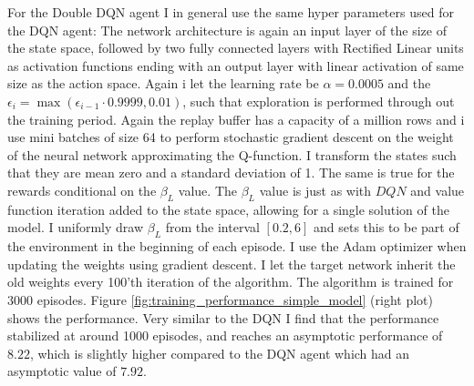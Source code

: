 For the Double DQN agent I in general use the same hyper parameters used for the DQN agent: The network architecture is again an input layer of the size of the state space, followed by two fully connected layers with Rectified Linear units as activation functions ending with an output layer with linear activation of same size as the action space. Again i let the learning rate be $\alpha = 0.0005$ and the $\epsilon_i = \max (\epsilon_{i-1} \cdot 0.9999, 0.01)$, such that exploration is performed through out the training period. Again the replay buffer has a capacity of a million rows and i use mini batches of size 64 to perform stochastic gradient descent on the weight of the neural network approximating the Q-function. I transform the states such that they are mean zero and a standard deviation of 1. The same is true for the rewards conditional on the $\beta_L$ value. The $\beta_L$ value is just as with $DQN$ and value function iteration added to the state space, allowing for a single solution of the model. I uniformly draw $\beta_L$ from the interval $[0.2, 6]$ and sets this to be part of the environment in the beginning of each episode. I use the Adam optimizer when updating the weights using gradient descent. I let the target network inherit the old weights every 100'th iteration of the algorithm. The algorithm is trained for 3000 episodes. Figure \ref{fig:training_performance_simple_model} (right plot) shows the performance. Very similar to the DQN I find that the performance stabilized at around 1000 episodes, and reaches an asymptotic performance of $8.22$, which is slightly higher compared to the DQN agent which had an asymptotic value of $7.92$.

